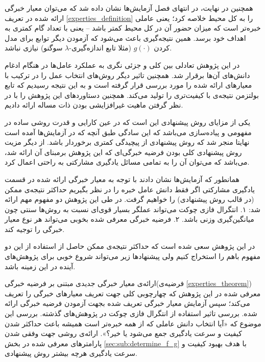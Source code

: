 همچنین در نهایت، در انتهای فصل آزمایش‌ها نشان داده شد که می‌توان معیار خبرگی ارائه شده در تعریف
\ref{experties_definition}
را به کل محیط خلاصه کرد؛ یعنی عاملی خبره‌تر است که میزان حضور آن در کل محیط کمتر باشد -- یعنی با تعداد گام کمتری به اهداف خود برسد. همین نتیجه‌گیری باعث می‌شود که آزمودن دیگر توابع برای مدل کردن $g(\cdot)$ (مثلا تابع اندازه‌گیری-$\lambda$ سوگنو) نیازی نباشد.

در این پژوهش تعادلی بین کلی و جزئی نگری به عملکرد عامل‌ها در هنگام ادغام دانش‌های آن‌ها برقرار شد. همچنین تاثیر دیگر روش‌های انتخاب عمل را در ترکیب با معیار‌های ارائه شده را مورد بررسی قرار گرفته است و به این نتیجه رسیدیم که تابع بولتزمن نتیجه‌ی با کیفیت‌تری را تولید می‌کند. همچنین دستاورد‌های این پژوهش را با در نظر گرفتن ماهیت غیرافزایشی بودن ذات مساله ارائه دادیم.

یکی از مزایای روش پیشنهادی این است که در عین کارایی و قدرت روشی ساده در مفهومی و پیاده‌سازی می‌باشد که این سادگی طبق آنچه که در آزمایش‌ها آمده است نهایتا منجر شد که روش پیشنهادی از پیچیدگی کمتری برخوردار باشد. از دیگر مزیت روش پیشنهادی کلی بودن فرضیه خبرگی‌ای که این پژوهش برمبنای آن ارائه شد، می‌باشد که می‌توان آن را به تمامی مسائل یادگیری مشارکتی به راحتی اعمال کرد.

همانطور که آزمایش‌ها نشان دادند با توجه به معیار خبرگی ارائه شده در قسمت یادگیری مشارکتی اگر فقط دانش عامل خبره را در نظر بگیریم حداکثر نتیجه‌ی ممکن (در قالب روش پیشنهادی) را خواهیم گرفت. در طی این پژوهش دو مفهوم مهم ارائه شد: ۱. انتگرال فازی چوکت می‌تواند عملگر بسیار قوی‌ای نسبت به روش‌ها سنتی چون میانگین‌گیری وزنی باشد. ۲. فرضیه خبرگی معرفی شده بخوبی می‌تواند هر نوع معیار خبرگی را توجیه کند.

در این پژوهش سعی شده است که حداکثر نتیجه‌ی ممکن حاصل از استفاده از این دو مفهوم باهم را استخراج کنیم ولی پیشنهادها زیر می‌تواند شروع خوبی برای پژوهش‌های آینده در این زمینه باشد.

\begin{enumerate}
 ارائه‌ی معیار خبرگی جدیدی مبتنی بر فرضیه خبرگی(فرضیه‌ی \ref{experties_theorem}) معرفی شده در این پژوهش که چهارچوبی کلی جهت تعریف معیارهای خبرگی را تعریف می‌کند؛ سپس آزمایش معیار خبرگی تعریف شده بجهت آزمودن فرضیه خبرگی ارائه شده.
 بررسی تاثیر استفاده از انتگرال فازی چوکت در پژوهش‌های گذشته.
 بررسی این موضوع که «آیا انتخاب دانش عاملی که از همه خبره‌تر است همیشه باعث حداکثر شدن کیفیت و سرعت یادگیری جمع می‌شود یا خیر؟».
 ارائه‌ی روشی جهت وفقی شدن پارامترهای معرفی شده در بخش \ref{sec:sub:determine_f_g} با هدف بهبود کیفیت و سرعت یادگیری هرچه بیشتر روش پیشنهادی.
\end{enumerate}